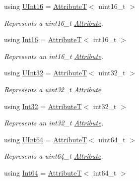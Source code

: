 \begin{DoxyCompactItemize}
using \hyperlink{group___process_attributes_ga1d4f77318c9b5cbb83ca3a9983c58829}{U\+Int16} = \hyperlink{structdg_1_1deepcore_1_1_attribute_t}{AttributeT}$<$ uint16\+\_\+t $>$
\begin{DoxyCompactList}\small\item\em Represents a {\ttfamily uint16\+\_\+t} \hyperlink{classdg_1_1deepcore_1_1_attribute}{Attribute}. \end{DoxyCompactList}\item 
using \hyperlink{group___process_attributes_gac2aeb0ab4afb8e7b231b95d178940f57}{Int16} = \hyperlink{structdg_1_1deepcore_1_1_attribute_t}{AttributeT}$<$ int16\+\_\+t $>$
\begin{DoxyCompactList}\small\item\em Represents an {\ttfamily int16\+\_\+t} \hyperlink{classdg_1_1deepcore_1_1_attribute}{Attribute}. \end{DoxyCompactList}\item 
using \hyperlink{group___process_attributes_ga685518764bcfc2ffb146ef7eb5882b3b}{U\+Int32} = \hyperlink{structdg_1_1deepcore_1_1_attribute_t}{AttributeT}$<$ uint32\+\_\+t $>$
\begin{DoxyCompactList}\small\item\em Represents a {\ttfamily uint32\+\_\+t} \hyperlink{classdg_1_1deepcore_1_1_attribute}{Attribute}. \end{DoxyCompactList}\item 
using \hyperlink{group___process_attributes_ga2c454952beddca2ef5ee37964bf022a7}{Int32} = \hyperlink{structdg_1_1deepcore_1_1_attribute_t}{AttributeT}$<$ int32\+\_\+t $>$
\begin{DoxyCompactList}\small\item\em Represents an {\ttfamily int32\+\_\+t} \hyperlink{classdg_1_1deepcore_1_1_attribute}{Attribute}. \end{DoxyCompactList}\item 
using \hyperlink{group___process_attributes_gad89c97a988d87ed15cbb54d25ea8fd97}{U\+Int64} = \hyperlink{structdg_1_1deepcore_1_1_attribute_t}{AttributeT}$<$ uint64\+\_\+t $>$
\begin{DoxyCompactList}\small\item\em Represents a {\ttfamily uint64\+\_\+t} \hyperlink{classdg_1_1deepcore_1_1_attribute}{Attribute}. \end{DoxyCompactList}\item 
using \hyperlink{group___process_attributes_gacab5ef809f8f2f471dfe6e40eaf1b36f}{Int64} = \hyperlink{structdg_1_1deepcore_1_1_attribute_t}{AttributeT}$<$ int64\+\_\+t $>$

\end{DoxyCompactItemize}
